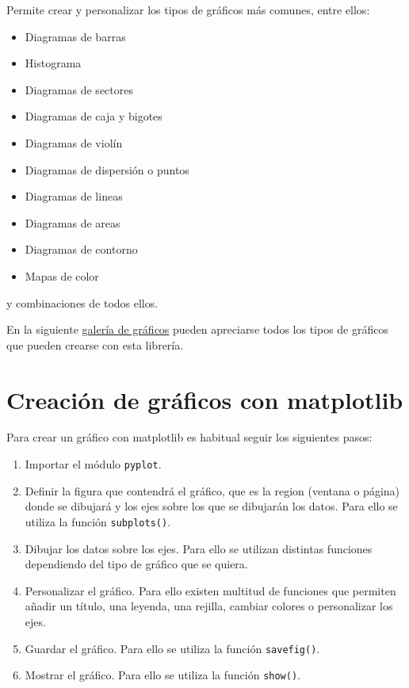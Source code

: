 \documentclass[
  spanish,
  a4paper,
]{scrreport}
\providecommand{\tightlist}{%
  \setlength{\itemsep}{0pt}\setlength{\parskip}{0pt}}
\begin{document}
Permite crear y personalizar los tipos de gráficos más comunes, entre
ellos:

\begin{itemize}
\tightlist
\item
  Diagramas de barras
\item
  Histograma
\item
  Diagramas de sectores
\item
  Diagramas de caja y bigotes
\item
  Diagramas de violín
\item
  Diagramas de dispersión o puntos
\item
  Diagramas de lineas
\item
  Diagramas de areas
\item
  Diagramas de contorno
\item
  Mapas de color
\end{itemize}

y combinaciones de todos ellos.

En la siguiente \href{https://matplotlib.org/gallery/index.html}{galería
de gráficos} pueden apreciarse todos los tipos de gráficos que pueden
crearse con esta librería.

\section{Creación de gráficos con
matplotlib}\label{creaciuxf3n-de-gruxe1ficos-con-matplotlib}

Para crear un gráfico con matplotlib es habitual seguir los siguientes
pasos:

\begin{enumerate}
\def\labelenumi{\arabic{enumi}.}
\item
  Importar el módulo \texttt{pyplot}.
\item
  Definir la figura que contendrá el gráfico, que es la region (ventana
  o página) donde se dibujará y los ejes sobre los que se dibujarán los
  datos. Para ello se utiliza la función \texttt{subplots()}.
\item
  Dibujar los datos sobre los ejes. Para ello se utilizan distintas
  funciones dependiendo del tipo de gráfico que se quiera.
\item
  Personalizar el gráfico. Para ello existen multitud de funciones que
  permiten añadir un título, una leyenda, una rejilla, cambiar colores o
  personalizar los ejes.
\item
  Guardar el gráfico. Para ello se utiliza la función
  \texttt{savefig()}.
\item
  Mostrar el gráfico. Para ello se utiliza la función \texttt{show()}.
\end{enumerate}
\end{document}
